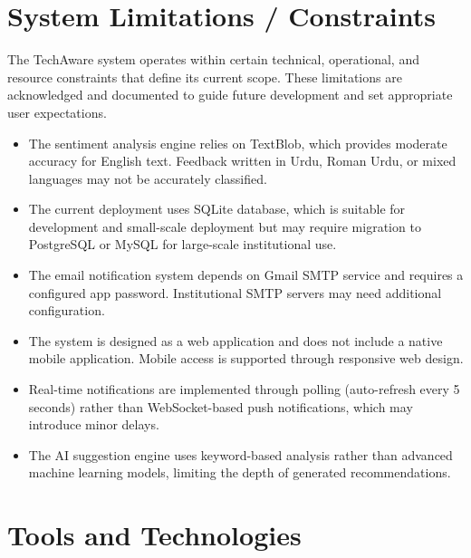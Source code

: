 
\section{System Limitations / Constraints}

The TechAware system operates within certain technical, operational, and resource constraints that define its current scope. These limitations are acknowledged and documented to guide future development and set appropriate user expectations.


\begin{itemize}
    \item The sentiment analysis engine relies on TextBlob, which provides moderate accuracy for English text. Feedback written in Urdu, Roman Urdu, or mixed languages may not be accurately classified.
    \item The current deployment uses SQLite database, which is suitable for development and small-scale deployment but may require migration to PostgreSQL or MySQL for large-scale institutional use.
    \item The email notification system depends on Gmail SMTP service and requires a configured app password. Institutional SMTP servers may need additional configuration.
    \item The system is designed as a web application and does not include a native mobile application. Mobile access is supported through responsive web design.
    \item Real-time notifications are implemented through polling (auto-refresh every 5 seconds) rather than WebSocket-based push notifications, which may introduce minor delays.
    \item The AI suggestion engine uses keyword-based analysis rather than advanced machine learning models, limiting the depth of generated recommendations.
\end{itemize}




\section{Tools and Technologies}

